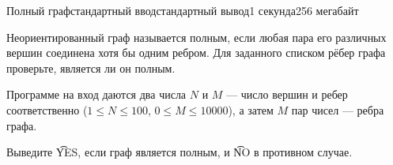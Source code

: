 \begin{problem}{Полный граф}{стандартный ввод}{стандартный вывод}{1 секунда}{256 мегабайт}

Неориентированный граф называется полным, если любая пара его различных вершин соединена хотя бы одним ребром. Для заданного списком рёбер графа проверьте, является ли он полным.

\InputFile
Программе на вход даются два числа $N$ и $M$ --- число вершин и ребер соответственно ($1 \le N \le 100$, $0 \le M \le 10000$), а затем $M$ пар чисел --- ребра графа.

\OutputFile
Выведите \t{YES}, если граф является полным, и \t{NO} в противном случае.

\Example

\begin{example}
%
\end{example}

\end{problem}

